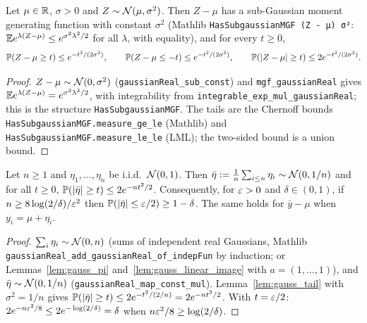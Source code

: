 \begin{lemma}\label{lem:gauss_tail}
\leanok
{}
Let $\mu \in \mathbb{R}$, $\sigma > 0$ and $Z \sim \mathcal{N}(\mu,\sigma^2)$. Then $Z - \mu$ has a
sub-Gaussian moment generating function with constant $\sigma^2$
(Mathlib \texttt{HasSubgaussianMGF (Z - μ) σ²}: $\mathbb{E} e^{\lambda(Z-\mu)} \le e^{\sigma^2\lambda^2/2}$
for all $\lambda$, with equality), and for every $t \ge 0$,
\[
  \mathbb{P}(Z - \mu \ge t) \le e^{-t^2/(2\sigma^2)}, \qquad
  \mathbb{P}(Z - \mu \le -t) \le e^{-t^2/(2\sigma^2)}, \qquad
  \mathbb{P}(\lvert Z - \mu \rvert \ge t) \le 2e^{-t^2/(2\sigma^2)} .
\]
\end{lemma}

\begin{proof}
\leanok
{}
$Z - \mu \sim \mathcal{N}(0,\sigma^2)$ (\texttt{gaussianReal\_sub\_const}) and
\texttt{mgf\_gaussianReal} gives $\mathbb{E} e^{\lambda(Z-\mu)} = e^{\sigma^2\lambda^2/2}$, with
integrability from \texttt{integrable\_exp\_mul\_gaussianReal}; this is the structure
\texttt{HasSubgaussianMGF}. The tails are the Chernoff bounds
\texttt{HasSubgaussianMGF.measure\_ge\_le} (Mathlib) and
\texttt{HasSubgaussianMGF.measure\_le\_le} (LML); the two-sided bound is a union bound.
\end{proof}

\begin{lemma}\label{lem:gauss_mean_concentration}
Let $n \ge 1$ and $\eta_1,\dots,\eta_n$ be i.i.d.\ $\mathcal{N}(0,1)$. Then
$\bar\eta := \frac1n\sum_{i\le n}\eta_i \sim \mathcal{N}(0, 1/n)$ and for all $t \ge 0$,
$\mathbb{P}(\lvert \bar\eta \rvert \ge t) \le 2e^{-nt^2/2}$. Consequently, for $\varepsilon > 0$ and
$\delta \in (0,1)$, if $n \ge 8\log(2/\delta)/\varepsilon^2$ then
$\mathbb{P}(\lvert \bar\eta \rvert \le \varepsilon/2) \ge 1 - \delta$. The same holds for $\bar y - \mu$ when
$y_i = \mu + \eta_i$.
\end{lemma}

\begin{proof}
$\sum_i\eta_i \sim \mathcal{N}(0,n)$ (sums of independent real Gaussians, Mathlib
\texttt{gaussianReal\_add\_gaussianReal\_of\_indepFun} by induction; or
Lemmas~\ref{lem:gauss_pi} and~\ref{lem:gauss_linear_image} with $a = (1,\dots,1)$), and
$\bar\eta \sim \mathcal{N}(0, 1/n)$ (\texttt{gaussianReal\_map\_const\_mul}). Lemma~\ref{lem:gauss_tail}
with $\sigma^2 = 1/n$ gives $\mathbb{P}(\lvert \bar\eta \rvert\ge t) \le 2e^{-t^2/(2/n)} = 2e^{-nt^2/2}$.
With $t = \varepsilon/2$: $2e^{-n\varepsilon^2/8} \le 2e^{-\log(2/\delta)} = \delta$ when
$n\varepsilon^2/8 \ge \log(2/\delta)$.
\end{proof}

